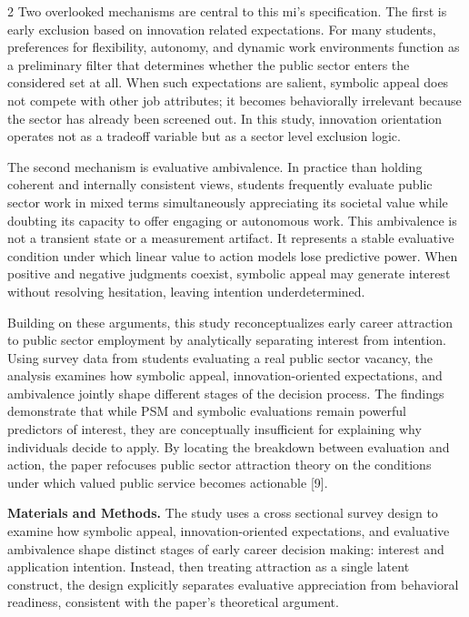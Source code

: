 \begin{multicols}{2}
Two overlooked mechanisms are central to this mi's specification. The
first is early exclusion based on innovation related expectations. For
many students, preferences for flexibility, autonomy, and dynamic work
environments function as a preliminary filter that determines whether
the public sector enters the considered set at all. When such
expectations are salient, symbolic appeal does not compete with other
job attributes; it becomes behaviorally irrelevant because the sector
has already been screened out. In this study, innovation orientation
operates not as a tradeoff variable but as a sector level exclusion
logic.

The second mechanism is evaluative ambivalence. In practice than holding
coherent and internally consistent views, students frequently evaluate
public sector work in mixed terms simultaneously appreciating its
societal value while doubting its capacity to offer engaging or
autonomous work. This ambivalence is not a transient state or a
measurement artifact. It represents a stable evaluative condition under
which linear value to action models lose predictive power. When positive
and negative judgments coexist, symbolic appeal may generate interest
without resolving hesitation, leaving intention underdetermined.

Building on these arguments, this study reconceptualizes early career
attraction to public sector employment by analytically separating
interest from intention. Using survey data from students evaluating a
real public sector vacancy, the analysis examines how symbolic appeal,
innovation-oriented expectations, and ambivalence jointly shape
different stages of the decision process. The findings demonstrate that
while PSM and symbolic evaluations remain powerful predictors of
interest, they are conceptually insufficient for explaining why
individuals decide to apply. By locating the breakdown between
evaluation and action, the paper refocuses public sector attraction
theory on the conditions under which valued public service becomes
actionable {[}9{]}.

{\bfseries Materials and Methods.} The study uses a cross sectional survey
design to examine how symbolic appeal, innovation-oriented expectations,
and evaluative ambivalence shape distinct stages of early career
decision making: interest and application intention. Instead, then
treating attraction as a single latent construct, the design explicitly
separates evaluative appreciation from behavioral readiness, consistent
with the paper's theoretical argument.


\end{multicols}
